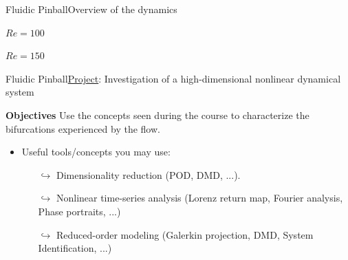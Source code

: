 \documentclass[usenames,dvipsnames,svgnames,10pt,aspectratio=169]{beamer}
\begin{document}
\begin{frame}[t, c]{Fluidic Pinball}{Overview of the dynamics}
	\begin{minipage}{.48\textwidth}
		\centering

		$Re = 100$
	\end{minipage}%
	\hfill
	\begin{minipage}{.48\textwidth}
		\centering

			$Re = 150$
	\end{minipage}

	\vspace{1cm}
\end{frame}

\begin{frame}[t, c]{Fluidic Pinball}{\underline{Project}: Investigation of a high-dimensional nonlinear dynamical system}
	\begin{block}{\centering \textbf{Objectives}}
		\centering
		Use the concepts seen during the course to characterize the bifurcations experienced by the flow.
	\end{block}

	\bigskip

	\begin{itemize}
		\item Useful tools/concepts you may use:
		\begin{itemize}
			\item[$\hookrightarrow$] Dimensionality reduction (POD, DMD, ...).
			\item[$\hookrightarrow$] Nonlinear time-series analysis (Lorenz return map, Fourier analysis, Phase portraits, ...)
			\item[$\hookrightarrow$] Reduced-order modeling (Galerkin projection, DMD, System Identification, ...)
		\end{itemize}
	\end{itemize}

	\vspace{1.5cm}
\end{frame}
\end{document}
